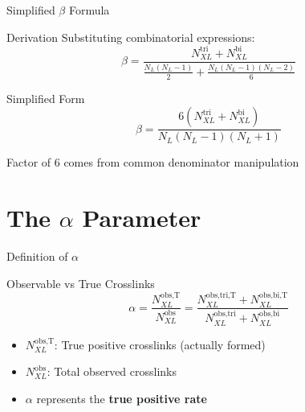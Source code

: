 \documentclass{beamer}
\begin{document}
\begin{frame}{Simplified $\beta$ Formula}
\begin{block}{Derivation}
Substituting combinatorial expressions:
\begin{equation}
    \beta = \frac{N^{\text{tri}}_{XL}+ N^{\text{bi}}_{XL}}{\frac{N_{L}(N_{L}-1)}{2}+\frac{N_{L}(N_{L}-1)(N_{L}-2)}{6}}
\end{equation}
\end{block}

\pause

\begin{block}{Simplified Form}
\begin{equation}
    \boxed{\beta = \frac{6\left(N^{\text{tri}}_{XL}+N^{\text{bi}}_{XL}\right)}{N_{L}(N_{L}-1)(N_{L}+1)}}
\end{equation}
\end{block}

\vspace{0.2cm}
\small{Factor of 6 comes from common denominator manipulation}
\end{frame}

\section{The $\alpha$ Parameter}

\begin{frame}{Definition of $\alpha$}
\begin{block}{Observable vs True Crosslinks}
\begin{equation}
    \alpha = \frac{N^{\text{obs,T}}_{XL}}{N^{\text{obs}}_{XL}} = \frac{N^{\text{obs,tri,T}}_{XL}+N^{\text{obs,bi,T}}_{XL}}{N^{\text{obs,tri}}_{XL}+N^{\text{obs,bi}}_{XL}}
\end{equation}
\end{block}

\vspace{0.5cm}

\begin{itemize}
    \item $N^{\text{obs,T}}_{XL}$: True positive crosslinks (actually formed)
    \item $N^{\text{obs}}_{XL}$: Total observed crosslinks
    \item $\alpha$ represents the \textbf{true positive rate}
\end{itemize}
\end{frame}
\end{document}

